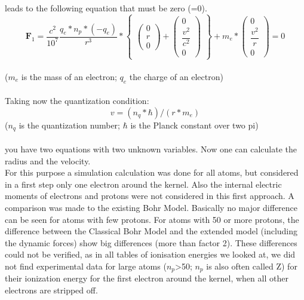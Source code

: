 \documentclass[10pt,titlepage]{article}
\begin{document}
leads to the following equation that must be zero (=0).
\\
\begin{equation}
\textbf{$\textbf{F}_1$}=\frac{c^2}{10^7}\dfrac{q_e*n_p*(-q_e)}{r^3}*
\begin{Bmatrix}
\begin{pmatrix}0 \\ r\\0\end{pmatrix}+
\begin{pmatrix}0 \\	\dfrac{v^2}{c^2} \\0\end{pmatrix}
\end{Bmatrix} +
m_e *
\begin{pmatrix}0 \\	\dfrac{v^2}{r} \\0\end{pmatrix}
=0
\end{equation}
\\($m_e$ is the mass of an electron; $q_e$ the charge of an electron)
\\
\\
Taking now the quantization condition:
\begin{equation}
v = (n_q * \hbar)/(r*m_e)
\end{equation}($n_q$ is the quantization number; $\hbar$  is the Planck constant over two pi)\\
\\you have two equations with two unknown variables.
Now one can calculate the radius and the velocity.
\\
For this purpose a simulation calculation was done for all atoms, but considered in a first step only one electron around the kernel. Also the internal electric moments of electrons and protons were not considered in this first approach. A comparison was made to the existing Bohr Model. Basically no major difference can be seen for atoms with few protons. For atoms with 50 or more protons, the difference between the Classical Bohr Model and the extended model (including the dynamic forces) show big differences (more than factor 2). These differences could not be verified, as in all tables of ionisation energies we looked at, we did not find experimental data for large atoms ($n_p$>50; $n_p$ is also often called Z) for their ionization energy for the first electron around the kernel, when all other electrons are stripped off.
\\
\\
\end{document}
